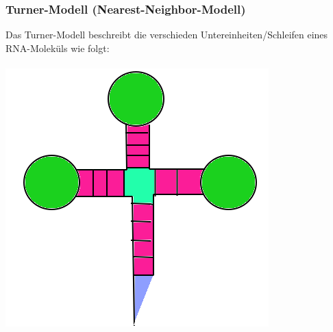 \subsubsection{Turner-Modell (Nearest-Neighbor-Modell)}
Das Turner-Modell beschreibt die verschieden Untereinheiten/Schleifen eines RNA-Molek\"uls wie folgt:\\\\
\includegraphics[scale=0.4]{lectures/160404_2/pix/turner}

